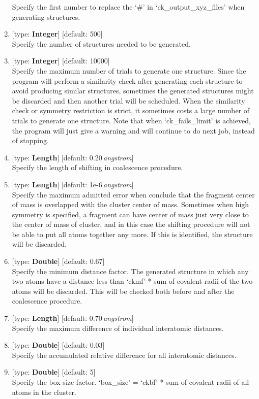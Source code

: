 \documentclass[11pt]{book}
\begin{document}
\begin{enumerate}
	Specify the first number to replace the `\#' in `ck\_output\_xyz\_files' when generating structures.
\item {} [type: \textbf{Integer}] [default: 500] \\
	Specify the number of structures needed to be generated.
\item {} [type: \textbf{Integer}] [default: 10000] \\
	Specify the maximum number of trials to generate one structure. Since the program will perform a similarity check after 
	generating each structure to avoid producing similar structures, sometimes the generated structures might be discarded 
	and then another trial will be scheduled. When the similarity check or symmetry restriction is strict, it sometimes 
	costs a large number of trials to generate one structure. Note that when `ck\_fails\_limit' is achieved, the program will 
	just give a warning and will continue to do next job, instead of stopping.
\item {} [type: \textbf{Length}] [default: 0.20\,\emph{angstrom}] \\
	Specify the length of shifting in coalescence procedure.
\item {} [type: \textbf{Length}] [default: 1e-6\,\emph{angstrom}] \\
	Specify the maximum admitted error when conclude that the fragment center of mass is overlapped with the cluster center of 
	mass. Sometimes when high symmetry is specified, a fragment can have center of mass just very close to the center of mass of 
	cluster, and in this case the shifting procedure will not be able to put all atoms together any more. If this is identified, 
	the structure will be discarded.
\item {} [type: \textbf{Double}] [default: 0.67] \\
	Specify the minimum distance factor. The generated structure in which any two atoms have a distance less than `ckmf' * sum of 
	covalent radii of the two atoms will be discarded. This will be checked both before and after the coalescence procedure.
\item {} [type: \textbf{Length}] [default: 0.70\,\emph{angstrom}] \\
	Specify the maximum difference of individual interatomic distances.
\item {} [type: \textbf{Double}] [default: 0.03] \\
	Specify the accumulated relative difference for all interatomic distances.
\item {} [type: \textbf{Double}] [default: 5] \\
	Specify the box size factor. `box\_size' = `ckbf' * sum of covalent radii of all atoms in the cluster.
\end{enumerate}
\end{document}
